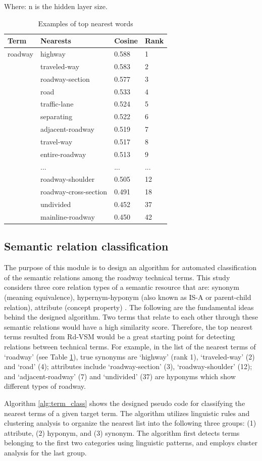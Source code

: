 \documentclass[Journal, BackFigs, DoubleSpace]{ascelike}%
\begin{document}
Where: n is the hidden layer size.
%
\begin{table} [t]
	\caption{Examples of top nearest words}
	\label{table:nearest_example}
	\centering
	\small
	\renewcommand{\arraystretch}{1.25}
	\begin{tabular}{l l l  l}
		\hline
		\textbf{Term} & \textbf{Nearests} & \textbf{Cosine} &\textbf{Rank}\\
		\hline
		roadway			& highway & 0.588 & 1\\
		& traveled-way & 0.583 & 2\\
		& roadway-section & 0.577 & 3\\
		& road & 0.533 & 4\\
		& traffic-lane & 0.524 &5\\
		& separating & 0.522 &6\\
		& adjacent-roadway & 0.519 & 7\\
		& travel-way & 0.517 & 8\\
		& entire-roadway & 0.513 & 9\\
		& ...&...& ...\\
		& roadway-shoulder & 0.505 & 12\\
		& roadway-cross-section & 0.491 & 18\\
		& undivided & 0.452 & 37\\
		& mainline-roadway & 0.450 & 42\\
		\hline
	\end{tabular}
	\normalsize
\end{table}

\subsection{Semantic relation classification}
The purpose of this module is to design an algorithm for automated classification of the semantic relations among the roadway technical terms. This study considers three core relation types of a semantic resource that are: synonym (meaning equivalence), hypernym-hyponym (also known as IS-A or parent-child relation), attribute (concept property) \cite{jiang1997semantic,lee13}. The following are the fundamental ideas behind the designed algorithm. Two terms that relate to each other through these semantic relations would have a high similarity score. Therefore, the top nearest terms resulted from Rd-VSM would be a great starting point for detecting relations between technical terms. For example, in the list of the nearest terms of `roadway' (see Table \ref{table:nearest_example}), true synonyms are `highway' (rank 1), `traveled-way' (2) and `road' (4); attributes include `roadway-section' (3), `roadway-shoulder' (12); and `adjacent-roadway' (7) and `undivided' (37) are hyponyms which show different types of roadway.
\par
Algorithm \ref{alg:term_class} shows the designed pseudo code for classifying the nearest terms of a given target term. The algorithm utilizes linguistic rules and clustering analysis to organize the nearest list into the following three groups: (1) attribute, (2) hyponym, and (3) synonym. The algorithm first detects terms belonging to the first two categories using linguistic patterns, and employs cluster analysis for the last group.
%
\end{document}
